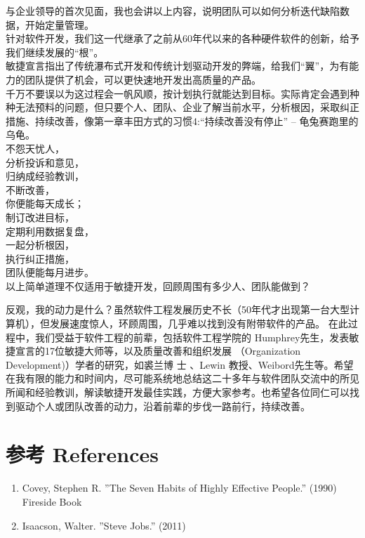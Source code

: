 与企业领导的首次见面，我也会讲以上内容，说明团队可以如何分析迭代缺陷数据，开始定量管理。\\
针对软件开发，我们这一代继承了之前从60年代以来的各种硬件软件的创新，给予我们继续发展的``根''。\\
敏捷宣言指出了传统瀑布式开发和传统计划驱动开发的弊端，给我们``翼''，为有能力的团队提供了机会，可以更快速地开发出高质量的产品。\\
千万不要误以为这过程会一帆风顺，按计划执行就能达到目标。实际肯定会遇到种种无法预料的问题，但只要个人、团队、企业了解当前水平，分析根因，采取纠正措施、持续改善，像第一章丰田方式的习惯4:“持续改善没有停止”  --  龟兔赛跑里的乌龟。\\
不怨天忧人，\\
分析投诉和意见，\\
归纳成经验教训，\\
不断改善，\\
你便能每天成长；\\
制订改进目标，\\
定期利用数据复盘，\\
一起分析根因，\\
执行纠正措施，\\
团队便能每月进步。\\
以上简单道理不仅适用于敏捷开发，回顾周围有多少人、团队能做到？\\


反观，我的动力是什么？虽然软件工程发展历史不长（50年代才出现第一台大型计算机），但发展速度惊人，环顾周围，几乎难以找到没有附带软件的产品。 
在此过程中，我们受益于软件工程的前辈，包括软件工程学院的 Humphrey先生，发表敏捷宣言的17位敏捷大师等，以及质量改善和组织发展 （Organization Development)）学者的研究，如裘兰博
士 、Lewin 教授、Weibord先生等。希望在我有限的能力和时间内，尽可能系统地总结这二十多年与软件团队交流中的所见所闻和经验教训，解读敏捷开发最佳实践，方便大家参考。也希望各位同仁可以找到驱动个人或团队改善的动力，沿着前辈的步伐一路前行，持续改善。 

\hypertarget{ux53c2ux8003-references}{%
\section{参考 References}\label{ux53c2ux8003-references}}

\begin{enumerate}
\tightlist
\item
  Covey, Stephen R. ''The Seven Habits of Highly Effective People.'' (1990) Fireside Book 
\item
   Isaacson, Walter. ''Steve Jobs.'' (2011)
\end{enumerate}



